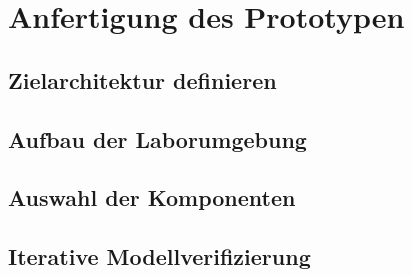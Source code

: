 \section{Anfertigung des Prototypen}
\subsection{Zielarchitektur definieren}
\subsection{Aufbau der Laborumgebung}
\subsection{Auswahl der Komponenten}
\subsection{Iterative Modellverifizierung}